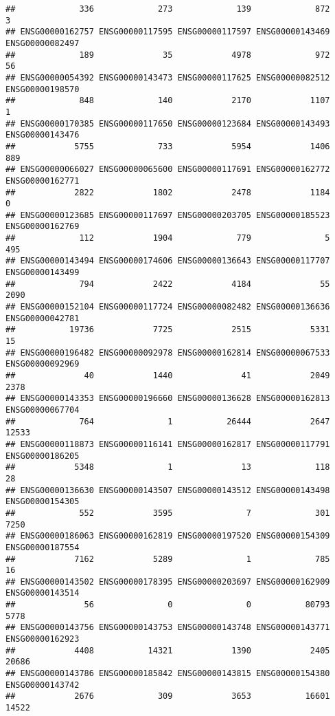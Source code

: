 \documentclass[
]{article}
\begin{document}
\begin{verbatim}
##             336             273             139             872               3 
## ENSG00000162757 ENSG00000117595 ENSG00000117597 ENSG00000143469 ENSG00000082497 
##             189              35            4978             972              56 
## ENSG00000054392 ENSG00000143473 ENSG00000117625 ENSG00000082512 ENSG00000198570 
##             848             140            2170            1107               1 
## ENSG00000170385 ENSG00000117650 ENSG00000123684 ENSG00000143493 ENSG00000143476 
##            5755             733            5954            1406             889 
## ENSG00000066027 ENSG00000065600 ENSG00000117691 ENSG00000162772 ENSG00000162771 
##            2822            1802            2478            1184               0 
## ENSG00000123685 ENSG00000117697 ENSG00000203705 ENSG00000185523 ENSG00000162769 
##             112            1904             779               5             495 
## ENSG00000143494 ENSG00000174606 ENSG00000136643 ENSG00000117707 ENSG00000143499 
##             794            2422            4184              55            2090 
## ENSG00000152104 ENSG00000117724 ENSG00000082482 ENSG00000136636 ENSG00000042781 
##           19736            7725            2515            5331              15 
## ENSG00000196482 ENSG00000092978 ENSG00000162814 ENSG00000067533 ENSG00000092969 
##              40            1440              41            2049            2378 
## ENSG00000143353 ENSG00000196660 ENSG00000136628 ENSG00000162813 ENSG00000067704 
##             764               1           26444            2647           12533 
## ENSG00000118873 ENSG00000116141 ENSG00000162817 ENSG00000117791 ENSG00000186205 
##            5348               1              13             118              28 
## ENSG00000136630 ENSG00000143507 ENSG00000143512 ENSG00000143498 ENSG00000154305 
##             552            3595               7             301            7250 
## ENSG00000186063 ENSG00000162819 ENSG00000197520 ENSG00000154309 ENSG00000187554 
##            7162            5289               1             785              16 
## ENSG00000143502 ENSG00000178395 ENSG00000203697 ENSG00000162909 ENSG00000143514 
##              56               0               0           80793            5778 
## ENSG00000143756 ENSG00000143753 ENSG00000143748 ENSG00000143771 ENSG00000162923 
##            4408           14321            1390            2405           20686 
## ENSG00000143786 ENSG00000185842 ENSG00000143815 ENSG00000154380 ENSG00000143742 
##            2676             309            3653           16601           14522 

\end{verbatim}
\end{document}
